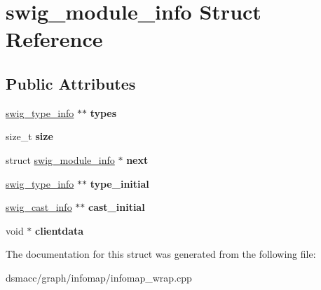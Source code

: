 \hypertarget{structswig__module__info}{}\section{swig\+\_\+module\+\_\+info Struct Reference}
\label{structswig__module__info}
\subsection*{Public Attributes}
\begin{DoxyCompactItemize}
\item 
\mbox{\label{structswig__module__info_ad658c7738e9a035ef8eea865322fbf13}} 
\mbox{\hyperlink{structswig__type__info}{swig\+\_\+type\+\_\+info}} $\ast$$\ast$ {\bfseries types}
\item 
\mbox{\label{structswig__module__info_aaf8907cf8509ee0464af8c9dfd909042}} 
size\+\_\+t {\bfseries size}
\item 
\mbox{\label{structswig__module__info_ac177d150b85ab77122089acf1f06d9c6}} 
struct \mbox{\hyperlink{structswig__module__info}{swig\+\_\+module\+\_\+info}} $\ast$ {\bfseries next}
\item 
\mbox{\label{structswig__module__info_a76c7d5b0fc10371748616d0b6c815a17}} 
\mbox{\hyperlink{structswig__type__info}{swig\+\_\+type\+\_\+info}} $\ast$$\ast$ {\bfseries type\+\_\+initial}
\item 
\mbox{\label{structswig__module__info_a15f6b50a41f144afb1148fc412dc01f7}} 
\mbox{\hyperlink{structswig__cast__info}{swig\+\_\+cast\+\_\+info}} $\ast$$\ast$ {\bfseries cast\+\_\+initial}
\item 
\mbox{\label{structswig__module__info_a9fb6e461fcaf14c209049adfae4e9754}} 
void $\ast$ {\bfseries clientdata}
\end{DoxyCompactItemize}


The documentation for this struct was generated from the following file\+:\begin{DoxyCompactItemize}
\item 
dsmacc/graph/infomap/infomap\+\_\+wrap.\+cpp\end{DoxyCompactItemize}
